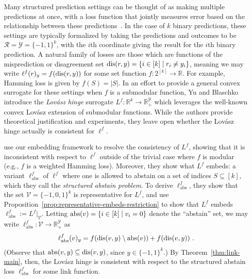 \documentclass[11pt]{article}
\newcommand{\reals}{\mathbb{R}}
\newcommand{\R}{\mathcal{R}}
\newcommand{\V}{\mathcal{V}}
\newcommand{\Y}{\mathcal{Y}}
\newcommand{\ellabs}{\ell_{\text{abs}}^f}
\begin{document}
Many structured prediction settings can be thought of as making multiple predictions at once, with a loss function that jointly measures error based on the relationship between these predictions~\cite{hazan2010direct, gao2011consistency, osokin2017structured}.
In the case of $k$ binary predictions, these settings are typically formalized by taking the predictions and outcomes to be $\R=\Y=\{-1,1\}^k$, with the $i$th coordinate giving the result for the $i$th binary prediction.
A natural family of losses are those which are functions of the misprediction or disagreement set $\mathrm{dis}(r,y) = \{i \in [k] \mid r_i \neq y_i\}$, meaning we may write $\ell^f(r)_y = f(\mathrm{dis}(r,y))$ for some set function $f:2^{[k]}\to\reals$.
For example, Hamming loss is given by $f(S) = |S|$.
In an effort to provide a general convex surrogate for these settings when $f$ is a submodular function, Yu and Blaschko~\cite{yu2018lovasz} introduce the \emph{Lov\'asz hinge} surrogate $L^f:\reals^k\to\reals^\Y_+$ which leverages the well-known convex Lov\'asz extension of submodular functions.
While the authors provide theoretical justification and experiments, they leave open whether the Lov\'asz hinge actually is consistent for $\ell^f$.

\citet{ourlovaszpaper} use our embedding framework to resolve the consistency of $L^f$, showing that it is inconsistent with respect to $\ell^f$ outside of the trivial case where $f$ is modular (e.g., $f$ is a weighted Hamming loss).
Moreover, they show what $L^f$ embeds: a variant $\ellabs$ of $\ell^f$ where one is allowed to abstain on a set of indices $S \subseteq [k]$, which they call the \emph{structured abstain problem}.
To derive $\ellabs$, they show that the set $\V = \{-1,0,1\}^k$ is representative for $L^f$, and use Proposition~\ref{prop:representative-embeds-restriction} to show that $L^f$ embeds $\ellabs := L^f|_{\V}$.
Letting $\mathrm{abs}(v) = \{i\in[k] \mid v_i = 0\}$ denote the ``abstain'' set, we may write $\ellabs : \V \to \reals^\Y_+$ as
\begin{equation}
	\ellabs(v)_y = f(\dis(v,y) \setminus \abs(v)) + f(\dis(v,y))~.
\end{equation}
(Observe that $\mathrm{abs}(v,y) \subseteq \mathrm{dis}(v,y)$, since $y\in\{-1,1\}^k$.)
By Theorem~\ref{thm:link-main}, then, the Lov\'asz hinge is consistent with respect to the structured abstain loss $\ellabs$ for some link function.
\end{document}
